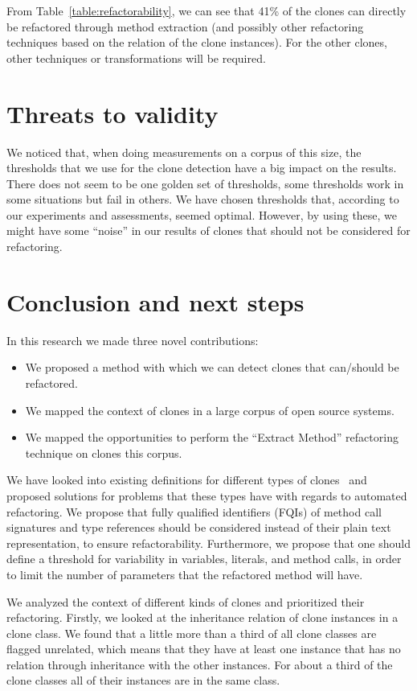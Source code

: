 \documentclass[a4paper]{article}
\begin{document}
From Table~\ref{table:refactorability}, we can see that 41\% of the clones can directly be refactored through method extraction (and possibly other refactoring techniques based on the relation of the clone instances). For the other clones, other techniques or transformations will be required.

\section{Threats to validity}\label{chap:threatstovalidity}
We noticed that, when doing measurements on a corpus of this size, the thresholds that we use for the clone detection have a big impact on the results. There does not seem to be one golden set of thresholds, some thresholds work in some situations but fail in others. We have chosen thresholds that, according to our experiments and assessments, seemed optimal. However, by using these, we might have some ``noise'' in our results of clones that should not be considered for refactoring.

\section{Conclusion and next steps}\label{chap:conclusion}
In this research we made three novel contributions:
\begin{itemize}
    \item We proposed a method with which we can detect clones that can/should be refactored.
    \item We mapped the context of clones in a large corpus of open source systems.
    \item We mapped the opportunities to perform the ``Extract Method'' refactoring technique on clones this corpus.
\end{itemize}

We have looked into existing definitions for different types of clones~\cite{roy2007survey} and proposed solutions for problems that these types have with regards to automated refactoring. We propose that fully qualified identifiers (FQIs) of method call signatures and type references should be considered instead of their plain text representation, to ensure refactorability. Furthermore, we propose that one should define a threshold for variability in variables, literals, and method calls, in order to limit the number of parameters that the refactored method will have.

We analyzed the context of different kinds of clones and prioritized their refactoring. Firstly, we looked at the inheritance relation of clone instances in a clone class. We found that a little more than a third of all clone classes are flagged unrelated, which means that they have at least one instance that has no relation through inheritance with the other instances. For about a third of the clone classes all of their instances are in the same class.
\end{document}
